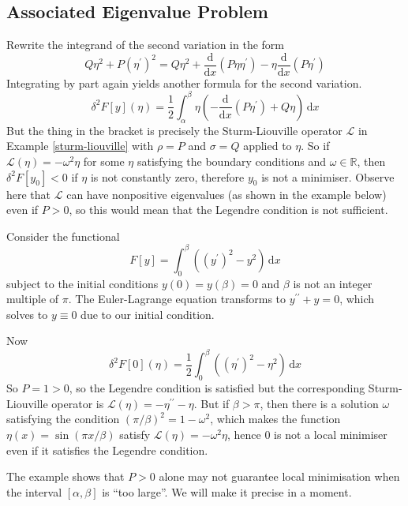 \documentclass{article}
\begin{document}
\subsection{Associated Eigenvalue Problem}
Rewrite the integrand of the second variation in the form
$$Q\eta^2+P(\eta^\prime)^2=Q\eta^2+\frac{\mathrm d}{\mathrm dx}(P\eta\eta^\prime)-\eta\frac{\mathrm d}{\mathrm dx}(P\eta^\prime)$$
Integrating by part again yields another formula for the second variation.
$$\delta^2F[y](\eta)=\frac{1}{2}\int_\alpha^\beta\eta\left( -\frac{\mathrm d}{\mathrm dx}(P\eta^\prime)+ Q\eta\right)\,\mathrm dx$$
But the thing in the bracket is precisely the Sturm-Liouville operator $\mathcal L$ in Example \ref{sturm-liouville} with $\rho=P$ and $\sigma=Q$ applied to $\eta$.
So if $\mathcal L(\eta)=-\omega^2\eta$ for some $\eta$ satisfying the boundary conditions and $\omega\in\mathbb R$, then $\delta^2F[y_0]<0$ if $\eta$ is not constantly zero, therefore $y_0$ is not a minimiser.
Observe here that $\mathcal L$ can have nonpositive eigenvalues (as shown in the example below) even if $P>0$, so this would mean that the Legendre condition is not sufficient.
\begin{example}
    Consider the functional
    $$F[y]=\int_0^\beta((y^\prime)^2-y^2)\,\mathrm dx$$
    subject to the initial conditions $y(0)=y(\beta)=0$ and $\beta$ is not an integer multiple of $\pi$.
    The Euler-Lagrange equation transforms to $y^{\prime\prime}+y=0$, which solves to $y\equiv 0$ due to our initial condition.

    Now
    $$\delta^2F[0](\eta)=\frac{1}{2}\int_0^\beta((\eta^\prime)^2-\eta^2)\,\mathrm dx$$
    So $P=1>0$, so the Legendre condition is satisfied but the corresponding Sturm-Liouville operator is $\mathcal L(\eta)=-\eta^{\prime\prime}-\eta$.
    But if $\beta>\pi$, then there is a solution $\omega$ satisfying the condition $(\pi/\beta)^2=1-\omega^2$, which makes the function $\eta(x)=\sin(\pi x/\beta)$ satisfy $\mathcal L(\eta)=-\omega^2\eta$, hence $0$ is not a local minimiser even if it satisfies the Legendre condition.
\end{example}
The example shows that $P>0$ alone may not guarantee local minimisation when the interval $[\alpha,\beta]$ is ``too large''.
We will make it precise in a moment.
\newpage
\end{document}
